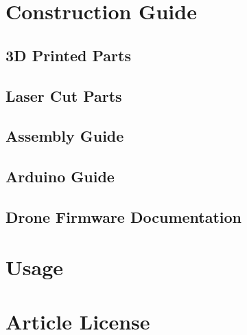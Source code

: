 \documentclass{hitec}
\begin{document}
	\section{Construction Guide}
	\subsection{3D Printed Parts}
	\subsection{Laser Cut Parts}
	\subsection{Assembly Guide}
	\subsection{Arduino Guide}
	\subsection{Drone Firmware Documentation}
	\section{Usage}
	\section{Article License}
	
	
\end{document}
